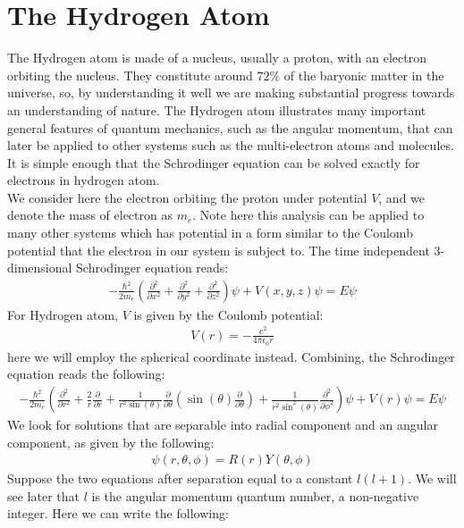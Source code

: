 \documentclass[11pt]{article}
\theoremstyle{break}
\theoremstyle{break}
\newcommand{\pd}{\partial}
\begin{document}
\newpage
\section{The Hydrogen Atom}
The Hydrogen atom is made of a nucleus, usually a proton, with an electron orbiting the nucleus. They constitute around $72\%$ of the baryonic matter in the universe, so, by understanding it well we are making substantial progress towards an understanding of nature. The Hydrogen atom illustrates many important general features of quantum mechanics, such as the angular momentum, that can later be applied to other systems such as the multi-electron atoms and molecules. It is simple enough that the Schrodinger equation can be solved exactly for electrons in hydrogen atom.\\

We consider here the electron orbiting the proton under potential $V$, and we denote the mass of electron as $m_e$. Note here this analysis can be applied to many other systems which has potential in a form similar to the Coulomb potential that the electron in our system is subject to. The time independent $3$-dimensional Schrodinger equation reads:
\begin{align*}
-\frac{\hbar^2}{2m_e}\left( \frac{\pd^2}{\pd x^2} + \frac{\pd^2}{\pd y^2} + \frac{\pd^2}{\pd z^2}\right) \psi + V(x,y,z)\psi = E\psi
\end{align*}
For Hydrogen atom, $V$ is given by the Coulomb potential:
\begin{align*}
V(r) = -\frac{e^2}{4\pi \epsilon_0 r}
\end{align*}
here we will employ the spherical coordinate instead. Combining, the Schrodinger equation reads the following:
\begin{align*}
-\frac{\hbar^2}{2m_e}\left( \frac{\partial^2}{\partial r^2}+ \frac{2}{r}\frac{\pd}{\pd r}+ \frac{1}{r^2\sin(\theta)}\frac{\pd}{\pd \theta}\left( \sin(\theta) \frac{\pd}{\pd \theta}\right)+ \frac{1}{r^2\sin^2(\theta)}\frac{\pd^2}{\pd \phi^2}\right) \psi + V(r) \psi = E\psi
\end{align*}
We look for solutions that are separable into radial component and an angular component, as given by the following:
\begin{align*}
\psi(r,\theta, \phi) = R(r) Y(\theta, \phi)
\end{align*}
Suppose the two equations after separation equal to a constant $l(l+1)$. We will see later that $l$ is the angular momentum quantum number, a non-negative integer. Here we can write the following:
\end{document}
